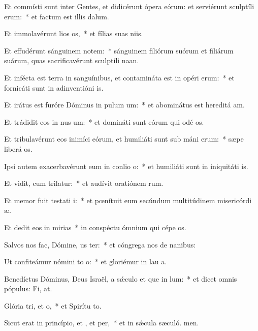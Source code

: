\item Et commísti sunt inter Gentes, et didicérunt ópera eórum: et serviérunt sculptíli erum:~* et factum est illis  dalum.
\item Et immolavérunt lios os,~* et fílias suas niis.
\item Et effudérunt sánguinem notem:~* sánguinem filiórum suórum et filiárum suárum, quas sacrificavérunt sculptíli naan.
\item Et infécta est terra in sanguínibus, et contamináta est in opéri erum:~* et fornicáti sunt in adinventióni is.
\item Et irátus est furóre Dóminus in pulum um:~* et abominátus est hereditá am.
\item Et trádidit eos in nus um:~* et domináti sunt eórum qui odé os.
\item Et tribulavérunt eos inimíci eórum, et humiliáti sunt sub máni erum:~* sæpe liberá os.
\item Ipsi autem exacerbavérunt eum in conlio o:~* et humiliáti sunt in iniquitáti is.
\item Et vidit, cum trilatur:~* et audívit oratiónem rum.
\item Et memor fuit testati i:~* et pœnítuit eum secúndum multitúdinem misericórdi æ.
\item Et dedit eos in mirias~* in conspéctu ómnium qui cépe os.
\item Salvos nos fac, Dómine, us ter:~* et cóngrega nos de nanibus:
\item Ut confiteámur nómini to o:~* et gloriémur in lau a.
\item Benedíctus Dóminus, Deus Israël, a sǽculo et que in lum:~* et dicet omnis pópulus: Fi, at.
\item Glória tri, et o,~* et Spirítu to.
\item Sicut erat in princípio, et , et per,~* et in sǽcula sæculó. men.
